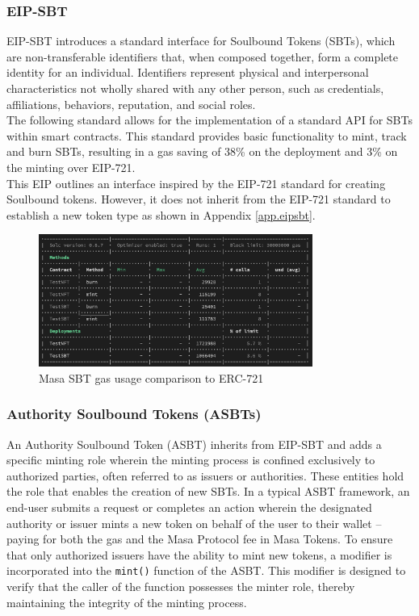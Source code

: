 \documentclass{article}
\begin{document}
\subsubsection{EIP-SBT}
EIP-SBT introduces a standard interface for Soulbound Tokens (SBTs), which are non-transferable identifiers that, when composed together, form a complete identity for an individual. Identifiers represent physical and interpersonal characteristics not wholly shared with any other person, such as credentials, affiliations, behaviors, reputation, and social roles. 
\\
\newline
The following standard allows for the implementation of a standard API for SBTs within smart contracts. This standard provides basic functionality to mint, track and burn SBTs, resulting in a gas saving of 38\% on the deployment and 3\% on the minting over EIP-721.
\\
\newline
This EIP outlines an interface inspired by the EIP-721 standard for creating Soulbound tokens. However, it does not inherit from the EIP-721 standard to establish a new token type as shown in Appendix \ref{app.eipsbt}.
\begin{figure}[h]
    \centering
    \includegraphics[width=0.8\textwidth]{gas-usage.png}
    \caption{Masa SBT gas usage comparison to ERC-721}
  \end{figure}
\subsubsection{Authority Soulbound Tokens (ASBTs)}

An Authority Soulbound Token (ASBT) inherits from EIP-SBT and adds a specific minting role wherein the minting process is confined exclusively to authorized parties, often referred to as issuers or authorities. These entities hold the role that enables the creation of new SBTs. In a typical ASBT framework, an end-user submits a request or completes an action wherein the designated authority or issuer mints a new token on behalf of the user to their wallet – paying for both the gas and the Masa Protocol fee in Masa Tokens. To ensure that only authorized issuers have the ability to mint new tokens, a modifier is incorporated into the \texttt{mint()} function of the ASBT. This modifier is designed to verify that the caller of the function possesses the minter role, thereby maintaining the integrity of the minting process.
\end{document}
